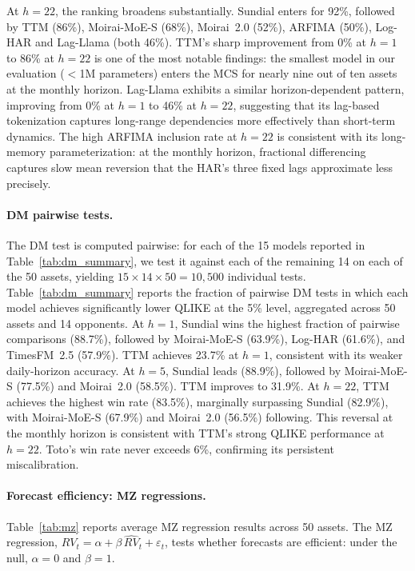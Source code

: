 \documentclass[12pt]{article}
\begin{document}
At $h = 22$, the ranking broadens substantially. Sundial enters for 92\%, followed by TTM (86\%), Moirai-MoE-S (68\%), Moirai~2.0 (52\%), ARFIMA (50\%), Log-HAR and Lag-Llama (both 46\%). TTM's sharp improvement from 0\% at $h = 1$ to 86\% at $h = 22$ is one of the most notable findings: the smallest model in our evaluation ($<$1M parameters) enters the MCS for nearly nine out of ten assets at the monthly horizon. Lag-Llama exhibits a similar horizon-dependent pattern, improving from 0\% at $h = 1$ to 46\% at $h = 22$, suggesting that its lag-based tokenization captures long-range dependencies more effectively than short-term dynamics. The high ARFIMA inclusion rate at $h = 22$ is consistent with its long-memory parameterization: at the monthly horizon, fractional differencing captures slow mean reversion that the HAR's three fixed lags approximate less precisely.

\paragraph{DM pairwise tests.}
The DM test is computed pairwise: for each of the 15 models reported in Table~\ref{tab:dm_summary}, we test it against each of the remaining 14 on each of the 50 assets, yielding $15 \times 14 \times 50 = 10{,}500$ individual tests. Table~\ref{tab:dm_summary} reports the fraction of pairwise DM tests in which each model achieves significantly lower QLIKE at the 5\% level, aggregated across 50 assets and 14 opponents. At $h = 1$, Sundial wins the highest fraction of pairwise comparisons (88.7\%), followed by Moirai-MoE-S (63.9\%), Log-HAR (61.6\%), and TimesFM~2.5 (57.9\%). TTM achieves 23.7\% at $h = 1$, consistent with its weaker daily-horizon accuracy. At $h = 5$, Sundial leads (88.9\%), followed by Moirai-MoE-S (77.5\%) and Moirai~2.0 (58.5\%). TTM improves to 31.9\%. At $h = 22$, TTM achieves the highest win rate (83.5\%), marginally surpassing Sundial (82.9\%), with Moirai-MoE-S (67.9\%) and Moirai~2.0 (56.5\%) following. This reversal at the monthly horizon is consistent with TTM's strong QLIKE performance at $h = 22$. Toto's win rate never exceeds 6\%, confirming its persistent miscalibration.

\paragraph{Forecast efficiency: MZ regressions.}
Table~\ref{tab:mz} reports average MZ regression results across 50 assets. The MZ regression, $RV_t = \alpha + \beta \, \widehat{RV}_t + \varepsilon_t$, tests whether forecasts are efficient: under the null, $\alpha = 0$ and $\beta = 1$.
\end{document}
